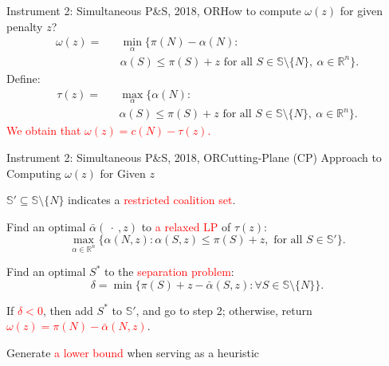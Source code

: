 \documentclass[14pt]{beamer}
\newcommand{\R}{\mathbb{R}}
\begin{document}
\begin{frame}{Instrument 2: Simultaneous P\&S, {\footnotesize 2018, OR}}{How to compute $\omega(z)$ for given penalty $z$?}
\vspace{-30pt}
\small
\begin{eqnarray*}
	\omega(z) = &&\min_{\alpha}\bigg\{ \pi(N) - \alpha(N):\\
	&& \alpha(S) \leq \pi(S)+z \mbox{ for all } S \in \mathbb{S} \setminus \{N\},~\alpha \in \R^n \bigg\}.
\end{eqnarray*}
Define:
\vspace{-10pt}
\begin{eqnarray*}
\tau(z) = && \max_{\alpha} \bigg\{ \alpha(N): \\
&& \alpha(S) \leq \pi(S)+z \mbox{ for all } S \in \mathbb{S} \setminus \{N\},~ \alpha \in \R^n \bigg\}.
\end{eqnarray*}
\textcolor{red}{We obtain that $\omega(z) = c(N)-\tau(z)$.}
\end{frame}



\begin{frame}{Instrument 2: Simultaneous P\&S, {\footnotesize 2018, OR}}{Cutting-Plane (CP) Approach to Computing $\omega(z)$ for Given $z$}
\small
{}
\begin{description}
\justifying
\item[Step 1.] $\mathbb{S}'\subseteq \mathbb{S}\setminus \{N\}$ indicates a \textcolor{red}{restricted coalition set}.
\item[Step 2.] Find an optimal $\bar{\alpha}(\ \cdot \ ,z)$ to \textcolor{red}{a relaxed LP} of $\tau(z)$:
\begin{equation*}
\max_{\alpha\in \R^n} \big\{ \alpha(N,z): \alpha(S,z) \leq \pi(S)+z, \mbox{ for all } S \in \mathbb{S}'\big\}.
\end{equation*}
\vspace{-11pt}
\item[Step 3.]
Find an optimal $S^*$ to the \textcolor{red}{separation problem}:
\begin{equation*}
\delta = \min \big\{ \pi(S)+z-\bar{\alpha}(S,z): \forall S \in \mathbb{S} \setminus \{N\}\big\}.
\end{equation*}
\item[Step 4.]
If \textcolor{red}{$\delta<0$}, then add $S^*$ to $\mathbb{S}'$, and go to step 2; otherwise, return \textcolor{red}{$\omega(z)=\pi(N)-\bar{\alpha}(N,z)$}. %
\end{description}
\begin{shaded}
\centering
Generate \textcolor{red}{a lower bound} when serving as a heuristic
\end{shaded}
\end{frame}
\end{document}
